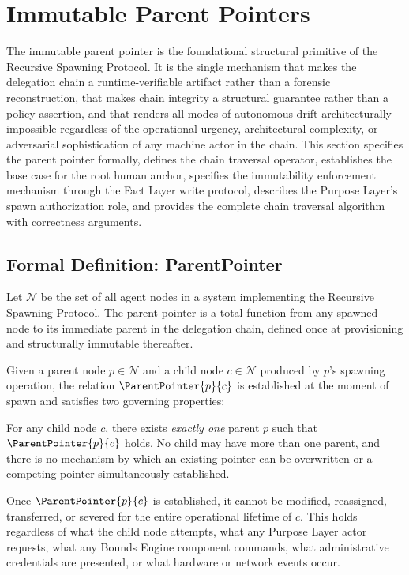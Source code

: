 \section{Immutable Parent Pointers}
\label{sec:immutable-parent-pointers}

The immutable parent pointer is the foundational structural primitive of the Recursive Spawning Protocol. It is the single mechanism that makes the delegation chain a runtime-verifiable artifact rather than a forensic reconstruction, that makes chain integrity a structural guarantee rather than a policy assertion, and that renders all modes of autonomous drift architecturally impossible regardless of the operational urgency, architectural complexity, or adversarial sophistication of any machine actor in the chain. This section specifies the parent pointer formally, defines the chain traversal operator, establishes the base case for the root human anchor, specifies the immutability enforcement mechanism through the Fact Layer write protocol, describes the Purpose Layer's spawn authorization role, and provides the complete chain traversal algorithm with correctness arguments.

\subsection{Formal Definition: ParentPointer}
\label{sec:parent-pointer-definition}

Let $\mathcal{N}$ be the set of all agent nodes in a \bxthree{} system implementing the Recursive Spawning Protocol. The parent pointer is a total function from any spawned node to its immediate parent in the delegation chain, defined once at provisioning and structurally immutable thereafter.

\begin{dfn}\label{dfn:parent-pointer}
Given a parent node $p \in \mathcal{N}$ and a child node $c \in \mathcal{N}$ produced by $p$'s spawning operation, the relation $\ParentPointer{p}{c}$ is established at the moment of spawn and satisfies two governing properties:

\begin{enumeratenoindex}
    \item[\textbf(Uniqueness)] For any child node $c$, there exists \emph{exactly one} parent $p$ such that $\ParentPointer{p}{c}$ holds. No child may have more than one parent, and there is no mechanism by which an existing pointer can be overwritten or a competing pointer simultaneously established.
    \item[\textbf(Immutability)] Once $\ParentPointer{p}{c}$ is established, it cannot be modified, reassigned, transferred, or severed for the entire operational lifetime of $c$. This holds regardless of what the child node attempts, what any Purpose Layer actor requests, what any Bounds Engine component commands, what administrative credentials are presented, or what hardware or network events occur.
\end{enumeratenoindex}
\end{dfn}


